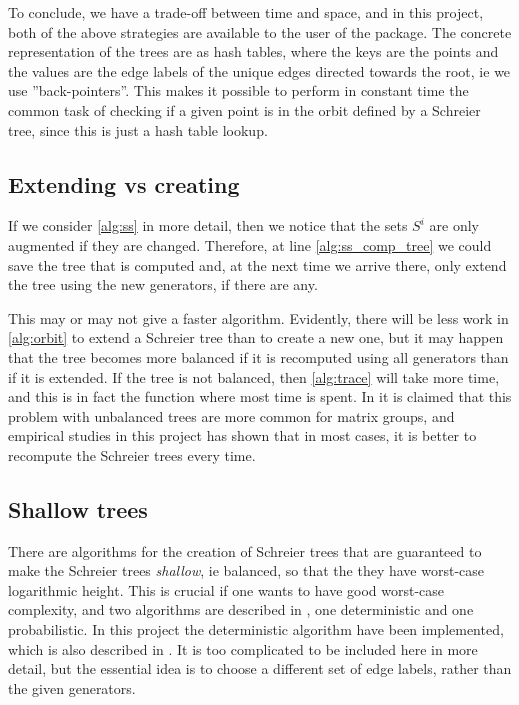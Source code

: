 To conclude, we have a trade-off between time and space, and in this
project, both of the above strategies are available to the user of the
package. The concrete representation of the trees are as hash tables,
where the keys are the points and the values are the edge labels of
the unique edges directed towards the root, ie we use
''back-pointers''. This makes it possible to perform in constant time
the common task of checking if a given point is in the orbit defined
by a Schreier tree, since this is just a hash table lookup.

\subsection{Extending vs creating}

If we consider \ref{alg:ss} in more detail, then we notice that the
sets $S^i$ are only augmented if they are changed. Therefore, at line
\ref{alg:ss_comp_tree} we could save the tree that is computed and, at
the next time we arrive there, only extend the tree using the new
generators, if there are any.

This may or may not give a faster algorithm. Evidently, there will be
less work in \ref{alg:orbit} to extend a Schreier tree than to create
a new one, but it may happen that the tree becomes more balanced if it
is recomputed using all generators than if it is extended. If the tree
is not balanced, then \ref{alg:trace} will take more time, and this is
in fact the function where most time is spent. In \cite{seress03} it
is claimed that this problem with unbalanced trees are more common for
matrix groups, and empirical studies in this project has shown that in
most cases, it is better to recompute the Schreier trees every time.

\subsection{Shallow trees}
There are algorithms for the creation of Schreier trees that are
guaranteed to make the Schreier trees \emph{shallow}, ie balanced, so
that the they have worst-case logarithmic height. This is crucial if
one wants to have good worst-case complexity, and two algorithms are
described in \cite{seress03}, one deterministic and one probabilistic.
In this project the deterministic algorithm have been implemented,
which is also described in \cite{seress91}. It is too complicated to
be included here in more detail, but the essential idea is to choose a
different set of edge labels, rather than the given generators.

